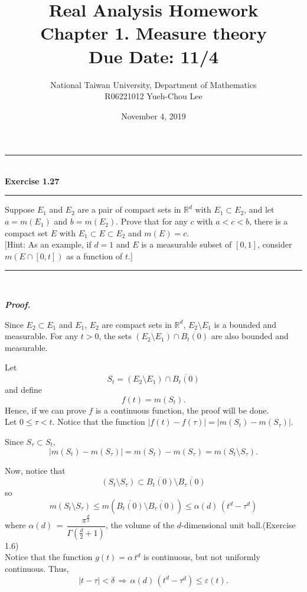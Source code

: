 \documentclass[a4paper,11pt]{article}
\title{Real Analysis Homework\\ Chapter 1. Measure theory\\ Due Date: 11/4}
\author{National Taiwan University, Department of Mathematics\\
R06221012 \hspace{0.2cm} Yueh-Chou Lee}
\date{November 4, 2019}
\begin{document}
\maketitle


\begin{flushleft}
	\rule[-0.5ex]{17cm}{2pt}\\
		\textbf{Exercise 1.27}\\
	\rule[1.5ex]{17cm}{0.5pt}
		Suppose $E_1$ and $E_2$ are a pair of compact sets in $\mathbb{R}^d$ with $E_1 \subset E_2$, and let $a = m(E_1)$ and $b = m(E_2)$. Prove that for any $c$ with $a < c < b$, there is a compact set $E$ with $E_1 \subset E \subset E_2$ and $m(E) = c$.\\
		$[$Hint: As an example, if $d = 1$ and $E$ is a measurable subset of $[0,1]$, consider $m(E \cap [0,t])$ as a function of $t$.$]$
	\rule[1.0ex]{17cm}{0.5pt}\
\end{flushleft}

\textbf{\textit{Proof.}}

Since $E_2 \subset E_1$ and $E_1$, $E_2$ are compact sets in $\mathbb{R}^d$, $E_2 \setminus E_1$ is a bounded and measurable. For any $t > 0$, the sets $(E_2 \setminus E_1) \cap \overline{B_t(0)}$ are also bounded and measurable.

Let
	$$S_t = (E_2 \setminus E_1) \cap \overline{B_t(0)}$$
and define
	$$f(t) = m(S_t).$$
Hence, if we can prove $f$ is a continuous function, the proof will be done.\\

Let $0 \leq \tau < t$. Notice that the function $|f(t) - f(\tau)| = |m(S_t) - m(S_\tau)|$.

Since $S_\tau \subset S_t$,
	$$|m(S_t) - m(S_\tau)| = m(S_t) - m(S_\tau) = m(S_t \setminus S_\tau).$$

Now, notice that
	$$(S_t \setminus S_\tau) \subset \overline{B_t(0)} \setminus \overline{B_\tau(0)}$$
so
	$$m(S_t \setminus S_\tau)
	\leq m(\overline{B_t(0)} \setminus \overline{B_\tau(0)})
	\leq \alpha(d)\,(t^d - \tau^d)$$
where $\alpha(d)\,=\,\dfrac{\pi^{\frac{d}{2}}}{\Gamma(\frac{d}{2} + 1)}$, the volume of the $d$-dimensional unit ball.(Exercise 1.6)\\

Notice that the function $g(t) = \alpha\,t^d$ is continuous, but not uniformly continuous. Thus,
	$$|t - \tau| < \delta \,\Rightarrow\,\alpha(d)\,(t^d - \tau^d) \leq \varepsilon(t).$$
\end{document}
